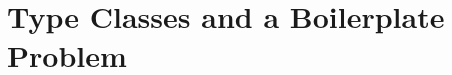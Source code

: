 \documentclass[preprint,nocopyrightspace]{sigplanconf}
\begin{document}

\section{Type Classes and a Boilerplate Problem}
\label{sec:background}
\end{document}
